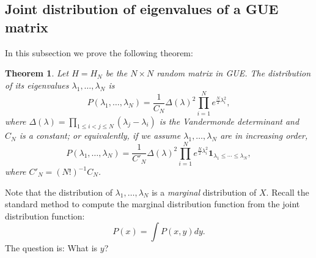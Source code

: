 \documentclass[11pt, a4paper]{article}
\numberwithin{equation}{section}
\newcommand{\id}{\mathbf{1}}
\newtheorem{thm}{Theorem}
\theoremstyle{definition}
\theoremstyle{remark}
\begin{document}
\subsection{Joint distribution of eigenvalues of a GUE matrix} \label{subsec:jpdf_GUE}

In this subsection we prove the following theorem:
\begin{thm} \label{thm:jpdf_GUE}
  Let $H = H_N$ be the $N \times N$ random matrix in GUE. The distribution of its eigenvalues $\lambda_1, \dotsc, \lambda_N$ is
  \begin{equation} \label{eq:jpdf_w_order}
    P(\lambda_1, \dotsc, \lambda_N) = \frac{1}{C_N} \Delta(\lambda)^2 \prod^N_{i = 1} e^{\frac{N}{2} \lambda^2_i},
  \end{equation}
  where $\Delta(\lambda) = \prod_{1 \leq i < j \leq N} (\lambda_j - \lambda_i)$ is the Vandermonde determinant and $C_N$ is a constant; or equivalently, if we assume $\lambda_1, \dotsc, \lambda_N$ are in increasing order,
  \begin{equation} \label{eq:jpdf_ordered}
    P(\lambda_1, \dotsc, \lambda_N) = \frac{1}{C'_N} \Delta(\lambda)^2 \prod^N_{i = 1} e^{\frac{N}{2} \lambda^2_i} \id_{\lambda_1 \leq \dotsb \leq \lambda_N},
  \end{equation}
  where $C'_N = (N!)^{-1} C_N$.
\end{thm}

Note that the distribution of $\lambda_1, \dotsc, \lambda_N$ is a \emph{marginal} distribution of $X$. Recall the standard method to compute the marginal distribution function from the joint distribution function:
\begin{equation}
  P(x) = \int P(x, y) dy.
\end{equation}
The question is: What is $y$?
\end{document}
